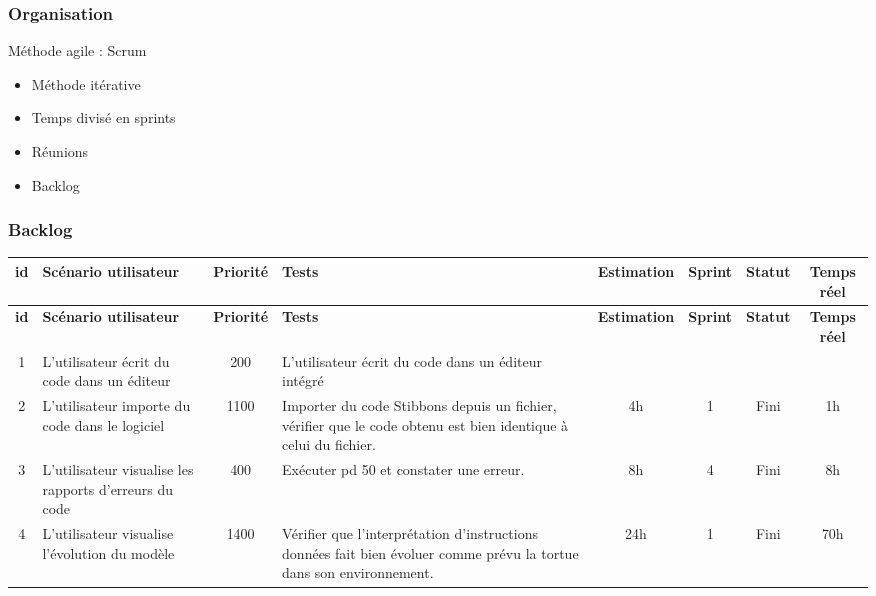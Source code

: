 \begin{frame}
\frametitle{Organisation}
Méthode agile : Scrum
\begin{itemize}
\item Méthode itérative
\item Temps divisé en sprints
\item Réunions
\item Backlog
\end{itemize}
\end{frame}


\begin{frame}
\frametitle{Backlog}
{\tiny
\begin{longtable}[c]{|c|p{1cm}|c|p{1.7cm}|*{4}{c|}}
\hline
\bf id & \bf Scénario utilisateur & \bf Priorité & \bf Tests & \bf Estimation & \bf Sprint & \bf Statut & \bf Temps réel \\
\hline
\endfirsthead
\hline
\bf id & \bf Scénario utilisateur & \bf Priorité & \bf Tests & \bf Estimation & \bf Sprint & \bf Statut & \bf Temps réel \\
\hline
\endhead
1 & L'utilisateur écrit du code dans un éditeur & 200 & L'utilisateur écrit du code dans un éditeur intégré & & & & \\
\hline
2 & L'utilisateur importe du code dans le logiciel & 1100 & Importer du code Stibbons depuis un fichier, vérifier que le code obtenu est bien identique à celui du fichier. & 4h & 1 & Fini & 1h \\
\hline
3 & L'utilisateur visualise les rapports d'erreurs du code & 400 & Exécuter pd 50 et constater une erreur. & 8h & 4 & Fini & 8h \\
\hline
4 & L'utilisateur visualise l'évolution du modèle & 1400 & Vérifier que l'interprétation d'instructions données fait bien évoluer comme prévu la tortue dans son environnement. & 24h & 1 & Fini & 70h \\
\hline
\end{longtable}}
\end{frame}

